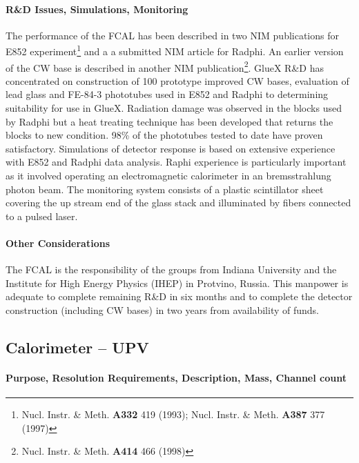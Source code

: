 \documentclass[11pt]{article}
\begin{document}
\paragraph{R\&D Issues, Simulations, Monitoring}

The performance of the FCAL has been described in two NIM publications for E852 
experiment\footnote{Nucl. Instr. \& Meth. \textbf{A332} 419 (1993); 
 Nucl. Instr. \& Meth. \textbf{A387} 377 (1997)} 
and a a submitted NIM article for Radphi. An earlier version of the CW base is described
in another NIM
publication\footnote{Nucl. Instr. \& Meth. \textbf{A414} 466 (1998)}.  
GlueX R\&D has concentrated on
construction of 100 prototype improved CW bases, evaluation of  lead glass and FE-84-3
phototubes used in E852 and Radphi to determining suitability for use in GlueX.
Radiation damage was observed in the blocks used by Radphi but a heat treating
technique has been developed that returns the blocks to new condition.
98\% of the phototubes tested to date have proven satisfactory.
Simulations of detector response is based on extensive
experience with E852 and Radphi data analysis.  
Raphi experience is particularly important
as it involved operating an electromagnetic calorimeter in an bremsstrahlung
photon beam.
The monitoring system consists of a plastic scintillator sheet covering the 
up stream end of the glass stack and illuminated by fibers connected to a pulsed laser.  



\paragraph{Other Considerations}

The FCAL is the responsibility of the groups from Indiana University and the Institute for
High Energy Physics (IHEP) in Protvino, Russia.  This manpower is adequate to complete
remaining R\&D in six months and to complete the detector construction (including CW bases) in
two years from availability of funds.

\subsection{Calorimeter -- UPV}


\paragraph{Purpose, Resolution Requirements, Description, Mass, Channel count}
\end{document}
